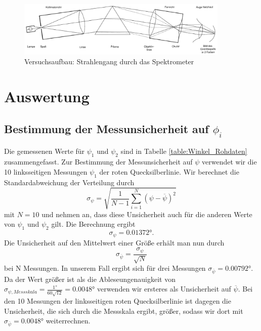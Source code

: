 \documentclass[12pt,a4paper]{article}
\begin{document}
\begin{figure}
	\centering
	\includegraphics[width=0.9\textwidth]{Bilder/Spektrometer_Aufbau.png}
	\caption{Versuchsaufbau: Strahlengang durch das Spektrometer}
	\label{Spektrometer_Aufbau}
\end{figure}

\section{Auswertung}



\subsection{Bestimmung der Messunsicherheit auf  $\phi_i$}
Die gemessenen Werte für $\psi_{1}$ und $\psi_2$ sind in Tabelle \ref{table:Winkel_Rohdaten} zusammengefasst. Zur Bestimmung der Messunsicherheit auf $\psi$ verwendet wir die 10 linksseitigen Messungen $\psi_1$ der roten Quecksilberlinie. 
Wir berechnet die Standardabweichung der Verteilung durch
\begin{equation}
\sigma_{\psi}=\sqrt{\frac{1}{N-1}\sum^{N}_{i=1}{(\psi-\overline{\psi})^2}}
\end{equation}
mit $N=10$ und nehmen an, dass diese Unsicherheit auch für die anderen Werte von $\psi_1$ und $\psi_2$ gilt. Die Berechnung ergibt
\begin{equation}
\sigma_{\psi}=\ang{0.01372}.
\end{equation}
Die Unsicherheit auf den Mittelwert einer Größe erhält man nun durch
\begin{equation}
\sigma_{\overline{\psi}}=\frac{\sigma_{\psi}}{\sqrt{N}}
\end{equation}
bei N Messungen.  In unserem Fall ergibt sich für drei Messungen $\sigma_{\overline{\psi}}=\ang{0.00792}$. Da der Wert größer ist als die Ableseungenauigkeit von $\sigma_{\psi, Messskala}=\frac{\ang{1}}{60\sqrt{12}}=\ang{0.0048}$ verwenden wir ersteres als Unsicherheit auf $\overline{\psi}$. Bei den 10 Messungen der linksseitigen roten Quecksilberlinie ist dagegen die Unsicherheit, die sich durch die Messskala ergibt, größer, sodass wir dort mit $\sigma_{\overline{\psi}}=\ang{0.0048}$ weiterrechnen.
\end{document}
